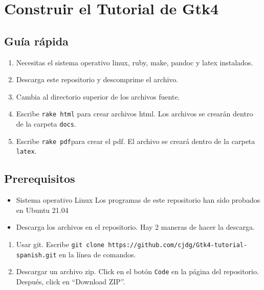 \hypertarget{construir-el-tutorial-de-gtk4}{%
\section{Construir el Tutorial de
Gtk4}\label{construir-el-tutorial-de-gtk4}}

\hypertarget{guuxeda-ruxe1pida}{%
\subsection{Guía rápida}\label{guuxeda-ruxe1pida}}

\begin{enumerate}
\def\labelenumi{\arabic{enumi}.}
\tightlist
\item
  Necesitas el sistema operativo linux, ruby, make, pandoc y latex
  instalados.
\item
  Descarga este repositorio y descomprime el archivo.
\item
  Cambia al directorio superior de los archivos fuente.
\item
  Escribe \texttt{rake\ html} para crear archivos html. Los archivos se
  crearán dentro de la carpeta \texttt{docs}.
\item
  Escribe \texttt{rake\ pdf}para crear el pdf. El archivo se creará
  dentro de la carpeta \texttt{latex}.
\end{enumerate}

\hypertarget{prerequisitos}{%
\subsection{Prerequisitos}\label{prerequisitos}}

\begin{itemize}
\tightlist
\item
  Sistema operativo Linux Los programas de este repositorio han sido
  probados en Ubuntu 21.04
\item
  Descarga los archivos en el repositorio. Hay 2 maneras de hacer la
  descarga.
\end{itemize}

\begin{enumerate}
\def\labelenumi{\arabic{enumi}.}
\tightlist
\item
  Usar git. Escribe
  \texttt{git\ clone\ https://github.com/cjdg/Gtk4-tutorial-spanish.git}
  en la línea de comandos.
\item
  Descargar un archivo zip. Click en el botón \texttt{Code} en la página
  del repositorio. Después, click en ``Download ZIP''.
\end{enumerate}


